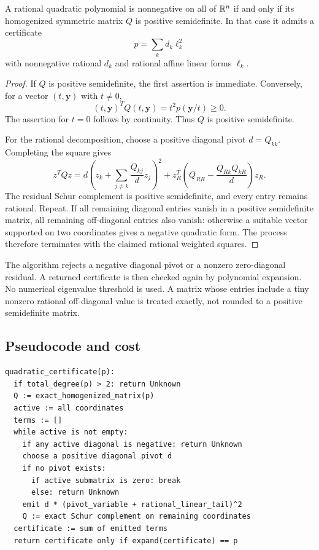 \begin{theorem}
A rational quadratic polynomial is nonnegative on all of $\mathbb{R}^n$ if and only if its homogenized symmetric matrix $Q$ is positive semidefinite. In that case it admits a certificate
\[
 p=\sum_k d_k\ell_k^2
\]
with nonnegative rational $d_k$ and rational affine linear forms $\ell_k$.
\end{theorem}
\begin{proof}
If $Q$ is positive semidefinite, the first assertion is immediate. Conversely, for a vector $(t,\bm y)$ with $t\ne0$,
\[
 (t,\bm y)^TQ(t,\bm y)=t^2p(\bm y/t)\ge0.
\]
The assertion for $t=0$ follows by continuity. Thus $Q$ is positive semidefinite.

For the rational decomposition, choose a positive diagonal pivot $d=Q_{kk}$. Completing the square gives
\[
 z^TQz=d\left(z_k+\sum_{j\ne k}\frac{Q_{kj}}d z_j\right)^2
    +z_R^T\left(Q_{RR}-\frac{Q_{Rk}Q_{kR}}d\right)z_R.
\]
The residual Schur complement is positive semidefinite, and every entry remains rational. Repeat. If all remaining diagonal entries vanish in a positive semidefinite matrix, all remaining off-diagonal entries also vanish: otherwise a suitable vector supported on two coordinates gives a negative quadratic form. The process therefore terminates with the claimed rational weighted squares.
\end{proof}

The algorithm rejects a negative diagonal pivot or a nonzero zero-diagonal residual. A returned certificate is then checked again by polynomial expansion. No numerical eigenvalue threshold is used. A matrix whose entries include a tiny nonzero rational off-diagonal value is treated exactly, not rounded to a positive semidefinite matrix.

\subsection{Pseudocode and cost}

\begin{lstlisting}
quadratic_certificate(p):
  if total_degree(p) > 2: return Unknown
  Q := exact_homogenized_matrix(p)
  active := all coordinates
  terms := []
  while active is not empty:
    if any active diagonal is negative: return Unknown
    choose a positive diagonal pivot d
    if no pivot exists:
      if active submatrix is zero: break
      else: return Unknown
    emit d * (pivot_variable + rational_linear_tail)^2
    Q := exact Schur complement on remaining coordinates
  certificate := sum of emitted terms
  return certificate only if expand(certificate) == p
\end{lstlisting}

